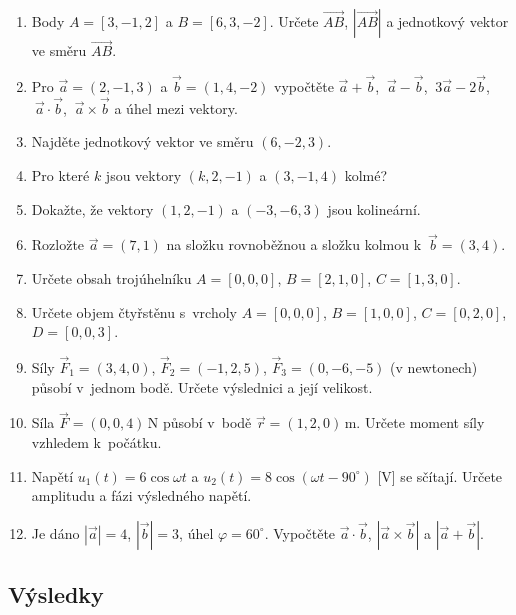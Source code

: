 \documentclass[a4paper,11pt]{article}
\newcommand{\abs}[1]{\left\lvert #1\right\rvert}
\newcommand{\jed}[1]{\,\mathrm{#1}}      %
\begin{document}
\begin{enumerate}[label=\textbf{\arabic*.},leftmargin=*,itemsep=3pt]
  \item Body $A=[3,-1,2]$ a $B=[6,3,-2]$. Určete $\overrightarrow{AB}$, $\abs{\overrightarrow{AB}}$
        a jednotkový vektor ve směru $\overrightarrow{AB}$.
  \item Pro $\vec a=(2,-1,3)$ a $\vec b=(1,4,-2)$ vypočtěte
        $\vec a+\vec b$, $\ \vec a-\vec b$, $\ 3\vec a-2\vec b$, $\ \vec a\cdot\vec b$, $\ \vec a\times\vec b$
        a úhel mezi vektory.
  \item Najděte jednotkový vektor ve směru $(6,-2,3)$.
  \item Pro které $k$ jsou vektory $(k,2,-1)$ a $(3,-1,4)$ kolmé?
  \item Dokažte, že vektory $(1,2,-1)$ a $(-3,-6,3)$ jsou kolineární.
  \item Rozložte $\vec a=(7,1)$ na složku rovnoběžnou a složku kolmou k~$\vec b=(3,4)$.
  \item Určete obsah trojúhelníku $A=[0,0,0]$, $B=[2,1,0]$, $C=[1,3,0]$.
  \item Určete objem čtyřstěnu s~vrcholy $A=[0,0,0]$, $B=[1,0,0]$, $C=[0,2,0]$, $D=[0,0,3]$.
  \item Síly $\vec F_1=(3,4,0)$, $\vec F_2=(-1,2,5)$, $\vec F_3=(0,-6,-5)$ (v newtonech)
        působí v~jednom bodě. Určete výslednici a její velikost.
  \item Síla $\vec F=(0,0,4)\jed{N}$ působí v~bodě $\vec r=(1,2,0)\jed{m}$. Určete moment síly
        vzhledem k~počátku.
  \item Napětí $u_1(t)=6\cos\omega t$ a $u_2(t)=8\cos(\omega t-90^\circ)$ [V] se sčítají.
        Určete amplitudu a fázi výsledného napětí.
  \item Je dáno $\abs{\vec a}=4$, $\abs{\vec b}=3$, úhel $\varphi=60^\circ$. Vypočtěte
        $\vec a\cdot\vec b$, $\abs{\vec a\times\vec b}$ a $\abs{\vec a+\vec b}$.
\end{enumerate}

\subsection*{Výsledky}
\end{document}
